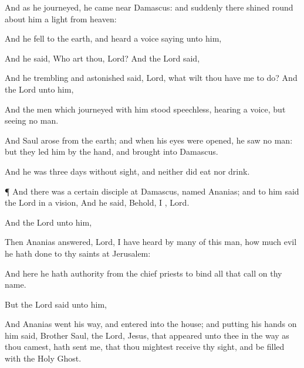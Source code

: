 {And
as he
journeyed,
he
came
near
Damascus:
and
suddenly there shined round
about
him a
light
from
heaven:

And he
fell
to the
earth, and
heard a
voice
saying unto
him,
{}

And he
said,
Who art
thou,
Lord?
And the
Lord
said,
{}

And he
trembling
and
astonished
said,
Lord,
what wilt
thou
have
me to
do?
And the
Lord
{}
unto
him,
{}

And the
men
which
journeyed with
him
stood
speechless,
hearing a
voice,
but
seeing no
man.

And
Saul
arose
from the
earth; and
when
his
eyes were
opened, he
saw no
man:
but they
led
him by the
hand, and
brought
{}
into
Damascus.

And he
was
three
days
without
sight,
and
neither did
eat
nor
drink.


\par }{\PP {}¶
And there
was a
certain
disciple
at
Damascus,
named
Ananias;
and
to
him
said the
Lord
in a
vision,
{}
And he
said,
Behold,
I
{},
Lord.

And the
Lord
{}
unto
him,
{}


Then
Ananias
answered,
Lord, I have
heard
by
many
of
this
man, how
much
evil he hath
done to
thy
saints
at
Jerusalem:

And
here he
hath
authority
from the chief
priests to
bind
all that call
on
thy
name.

But the
Lord
said
unto
him,
{}


And
Ananias went his
way,
and
entered
into the
house;
and putting
his
hands
on
him
said,
Brother
Saul, the
Lord,
{}
Jesus,
that
appeared unto
thee
in the
way
as thou
camest, hath
sent
me,
that thou mightest receive thy
sight,
and be
filled with the
Holy
Ghost.

}

